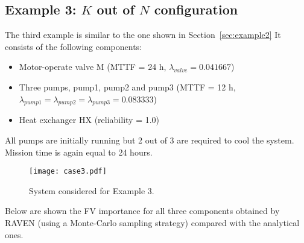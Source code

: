 \subsection{Example 3: $K$ out of $N$ configuration}
\label{sec:example3}

The third example is similar to the one shown in Section~\ref{sec:example2}
It consists of the following components:
\begin{itemize}
  \item Motor-operate valve M (MTTF = 24 h, $\lambda_{valve} = 0.041667$)
  \item Three pumps, pump1, pump2 and pump3 
        (MTTF = 12 h, $\lambda_{pump1} = \lambda_{pump2} = \lambda_{pump3} = 0.083333$)
  \item Heat exchanger HX (reliability = 1.0)
\end{itemize}
All pumps are initially running but 2 out of 3 are required to cool the system.
Mission time is again equal to 24 hours.

\begin{figure}
    \centering
    \centerline{\texttt{[image: case3.pdf]}}
    \caption{System considered for Example 3.}
    \label{fig:example4}
\end{figure}

Below are shown the FV importance for all three components obtained by RAVEN (using a Monte-Carlo 
sampling strategy) compared with the analytical ones.

